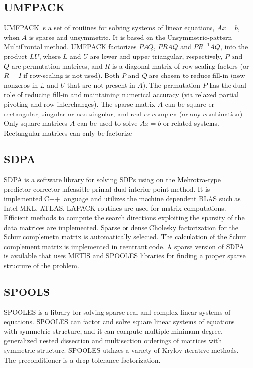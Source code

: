 \subsection{UMFPACK}
UMFPACK is a set of routines for solving systems of linear
equations, $Ax = b$, when $A$ is sparse and unsymmetric. It is
based on the Unsymmetric-pattern MultiFrontal method. UMFPACK
factorizes $PAQ$, $PRAQ$ and $PR^{-1}AQ$, into the product
$LU$, where $L$ and $U$ are lower and upper triangular,
respectively, $P$ and $Q$ are permutation matrices, and $R$ is
a diagonal matrix of row scaling factors (or $R = I$ if
row-scaling is not used). Both $P$ and $Q$ are chosen to reduce
fill-in (new nonzeros in $L$ and $U$ that are not present in
$A$). The permutation $P$ has the dual role of reducing fill-in
and maintaining numerical accuracy (via relaxed partial
pivoting and row interchanges). The sparse matrix $A$ can be
square or rectangular, singular or non-singular, and real or
complex (or any combination). Only square matrices $A$ can be
used to solve $Ax = b$ or related systems. Rectangular matrices
can only be factorize

\subsection{SDPA}
SDPA is a software library for solving SDPs using on the
Mehrotra-type predictor-corrector infeasible primal-dual
interior-point method. It is implemented C++ language and
utilizes the machine dependent BLAS such as Intel MKL, ATLAS.
LAPACK routines are used for matrix computations.  Efficient
methods to compute the search directions exploiting the
sparsity of the data matrices are implemented. Sparse or dense
Cholesky factorization for the Schur complemetn matrix is
automatically selected. The calculation of the Schur complement
matrix is implemented in reentrant code. A sparse version of
SDPA is available that uses METIS and SPOOLES libraries for
finding a proper sparse structure of the problem.

\subsection{SPOOLS}
SPOOLES is a library for solving sparse real and complex linear
systems of equations. SPOOLES can factor and solve square
linear systems of equations with symmetric structure, and it
can compute multiple minimum degree, generalized nested
dissection and multisection orderings of matrices with
symmetric structure.  SPOOLES utilizes a variety of Krylov
iterative methods. The preconditioner is a drop tolerance
factorization.


